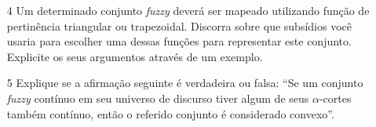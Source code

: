 \documentclass{report}
\begin{document}
\begin{enumerate}
\item[4] Um determinado conjunto \emph{fuzzy} deverá ser mapeado utilizando função de pertinência
triangular ou trapezoidal. Discorra sobre que subsídios você usaria para escolher uma dessas
funções para representar este conjunto. Explicite os seus argumentos através de um exemplo.


\item[5] Explique se a afirmação seguinte é verdadeira ou falsa: “Se um conjunto \emph{fuzzy} contínuo em
seu universo de discurso tiver algum de seus $\alpha$-cortes também contínuo, então o referido
conjunto é considerado convexo”.

\end{enumerate}
\end{document}
